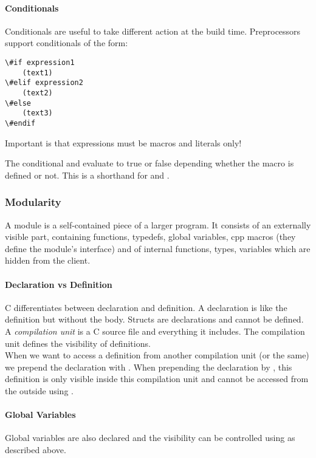 \paragraph{Conditionals}
Conditionals are useful to take different action at the build time. Preprocessors support conditionals of the form:
\begin{lstlisting}
\#if expression1
    (text1)
\#elif expression2
    (text2)
\#else
    (text3)
\#endif
\end{lstlisting}

Important is that expressions must be macros and literals only!

The conditional  and  evaluate to true or false depending whether the macro is defined or not. This is a shorthand for  and .

\subsubsection{Modularity}
A module is a self-contained piece of a larger program. It consists of an externally visible part, containing functions, typedefs, global variables, cpp macros (they define the module's interface) and of internal functions, types, variables which are hidden from the client.

\paragraph{Declaration vs Definition}
C differentiates between declaration and definition. A declaration is like the definition but without the body. Structs are declarations and cannot be defined.\\
A \textit{compilation unit} is a C source file and everything it includes. The compilation unit defines the visibility of definitions.\\
When we want to access a definition from another compilation unit (or the same) we prepend the declaration with . When prepending the declaration by , this definition is only visible inside this compilation unit and cannot be accessed from the outside using .

\paragraph{Global Variables}
Global variables are also declared and the visibility can be controlled using  as described above.

